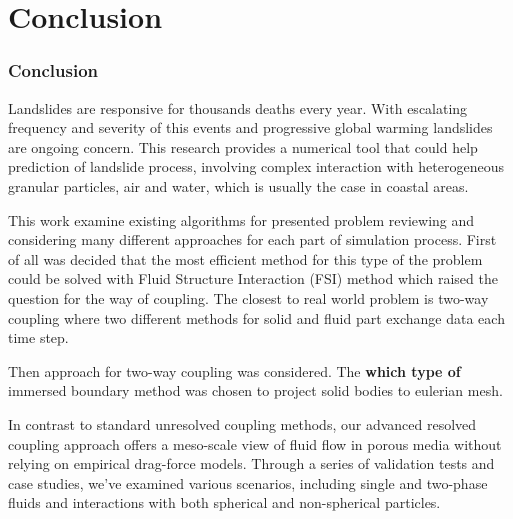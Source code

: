 \chapter{Conclusion} \label{chap:conclusion}
\subsection{Conclusion}
Landslides are responsive for thousands deaths every year. With escalating frequency and severity of this events and progressive global warming landslides are ongoing concern. This research provides a numerical tool that could help prediction of landslide process, involving complex interaction with heterogeneous granular particles, air and water, which is usually the case in coastal areas. 

This work examine existing algorithms for presented problem reviewing and considering many different approaches for each part of simulation process. First of all was decided that the most efficient method for this type of the problem could be solved with Fluid Structure Interaction (FSI) method which raised the question for the way of coupling. The closest to real world problem is two-way coupling where two different methods for solid and fluid part exchange data each time step.

Then approach for two-way coupling was considered. The \textbf{which type of } immersed boundary method was chosen to project solid bodies to eulerian mesh.

In contrast to standard unresolved coupling methods, our advanced resolved coupling approach offers a meso-scale view of fluid flow in porous media without relying on empirical drag-force models. Through a series of validation tests and case studies, we've examined various scenarios, including single and two-phase fluids and interactions with both spherical and non-spherical particles.

